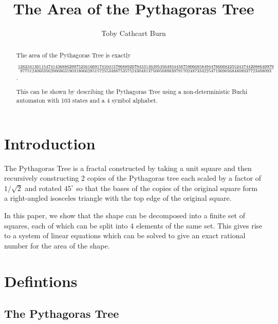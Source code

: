 \documentclass{article}
\author{Toby {Cathcart Burn}}
\title{The Area of the Pythagoras Tree}
\newcommand{\bounding}{
\draw[tsty] (-2.5,1) -- (-1.5,0) -- (2.5,0) -- (3.5,1) -- (3.5,2.5) -- (2,4) -- (-1,4) -- (-2.5, 2.5) -- cycle;
}
\newcommand{\subt}[2]{
    \begin{scope}[yshift=1cm,rotate=45,scale=0.7071]
        #1
    \end{scope}
    \begin{scope}[xshift=0.5cm,yshift=1.5cm,rotate=-45,scale=0.7071]
        #2
    \end{scope}
}
\newcommand{\dup}[1]{\subt{#1}{#1}}
\newcommand{\gtree}[3]{
	#2
	\ifthenelse{#1<2}{
		#3
	}{
		\dup{\gtree{\the\numexpr#1-1}{#2}{#3}}
	}
}
\newcommand{\tree}[1]{
	\gtree{#1}{\fill[tsty] (0,0) -- (1,0) -- (1,1) -- (0,1) -- cycle;}{}
}
\begin{document}
\maketitle
\begin{abstract}
The area of the Pythagoras Tree is exactly
    
${12823413011547414368862997525616691741041579688920794331363953564934456759066858494476606822552437442098640979}\over{877512406035620068631903180662851572553488753575243048137500508983979170248733422547196905684808937723408093}$.
    
This can be shown by describing the Pythagoras Tree using a non-deterministic Buchi automaton with 103 states %
and a 4 symbol alphabet.
\end{abstract}
\section{Introduction}\label{sec:intro}
The Pythagoras Tree is a fractal constructed by taking a unit square and then recursively constructing 2 copies of the Pythagoras tree each scaled by a factor of $1/\sqrt{2}$ and rotated $45^\circ$ so that the bases of the copies of the original square form a right-angled isosceles triangle with the top edge of the original square.

\begin{center}
\end{center}
In this paper, we show that the shape can be decomposed into a finite set of squares, each of which can be split into 4 elements of the same set. This gives rise to a system of linear equations which can be solved to give an exact rational number for the area of the shape.

\newpage
\section{Defintions}
\subsection{The Pythagoras Tree}
\end{document}
